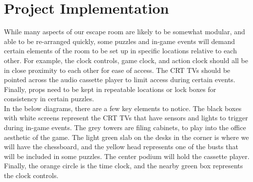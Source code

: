 \documentclass[conference]{IEEEtran}
\begin{document}
\section{Project Implementation}
While many aspects of our escape room are likely to be somewhat modular, and able to be re-arranged quickly,
some puzzles and in-game events will demand certain elements of the room to be set up in specific locations relative
to each other. For example, the clock controls, game clock, and action clock should all be in close proximity to each
other for ease of access. The CRT TVs should be pointed across the audio cassette player to limit
access during certain events. Finally, props need to be kept in repeatable
locations or lock boxes for consistency in certain puzzles.
\\
\indent In the below diagrams, there are a few key elements to notice. The black boxes with white screens
represent the CRT TVs that have sensors and lights to trigger during in-game events. The
grey towers are filing cabinets, to play into the office aesthetic of the game. The light green slab on the
desks in the corner is where we will have the chessboard, and the yellow head represents one of the busts
that will be included in some puzzles. The center podium will hold the cassette player. Finally, the orange circle
is the time clock, and the nearby green box represents the clock controls.
\end{document}

